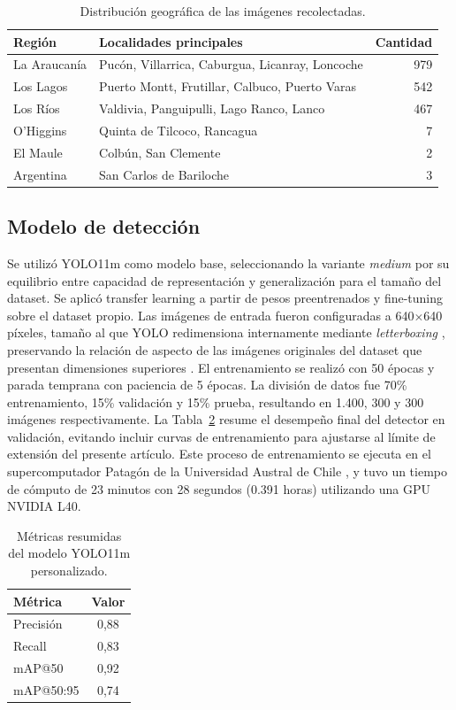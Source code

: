 \documentclass[conference]{IEEEtran}
\begin{document}
\begin{table}[!t]
\caption{Distribución geográfica de las imágenes recolectadas.}
\label{tab:dataset}
\centering
\footnotesize
\begin{tabular}{p{1.8cm}p{4.1cm}r}
\toprule
Región & Localidades principales & Cantidad \\
\midrule
La Araucanía & Pucón, Villarrica, Caburgua, Licanray, Loncoche & 979 \\
Los Lagos & Puerto Montt, Frutillar, Calbuco, Puerto Varas & 542 \\
Los Ríos & Valdivia, Panguipulli, Lago Ranco, Lanco & 467 \\
O'Higgins & Quinta de Tilcoco, Rancagua & 7 \\
El Maule & Colbún, San Clemente & 2 \\
Argentina & San Carlos de Bariloche & 3 \\
\bottomrule
\end{tabular}
\end{table}

\subsection{Modelo de detección}

Se utilizó YOLO11m como modelo base, seleccionando la variante 
\textit{medium} por su equilibrio entre capacidad de representación y 
generalización para el tamaño del dataset. Se aplicó transfer learning a partir de pesos
preentrenados y fine-tuning sobre el dataset propio. Las imágenes de entrada fueron 
configuradas a 640$\times$640 píxeles, tamaño al que YOLO redimensiona 
internamente mediante \textit{letterboxing} \cite{letterbox-yolo}, 
preservando la relación de aspecto de las imágenes originales del 
dataset que presentan dimensiones superiores \cite{yolo11_ultralytics}. 
El entrenamiento se realizó con 50 épocas y parada temprana con 
paciencia de 5 épocas. La división de datos fue 70\% entrenamiento, 
15\% validación y 15\% prueba, resultando en 1.400, 300 y 300 imágenes
respectivamente. La Tabla~\ref{tab:train_metrics} resume el 
desempeño final del detector en validación, evitando incluir curvas de 
entrenamiento para ajustarse al límite de extensión del presente artículo. Este proceso 
de entrenamiento se ejecuta en el supercomputador Patagón de la Universidad Austral de Chile \cite{patagon},
y tuvo un tiempo de cómputo de 23 minutos con 28 segundos (0.391 horas) 
utilizando una GPU NVIDIA L40.
\begin{table}[!t]
\caption{Métricas resumidas del modelo YOLO11m personalizado.}
\label{tab:train_metrics}
\centering
\begin{tabular}{lc}
\toprule
Métrica & Valor \\
\midrule
Precisión & 0,88 \\
Recall & 0,83 \\
mAP@50 & 0,92 \\
mAP@50:95 & 0,74 \\
\bottomrule
\end{tabular}
\end{table}
\end{document}
